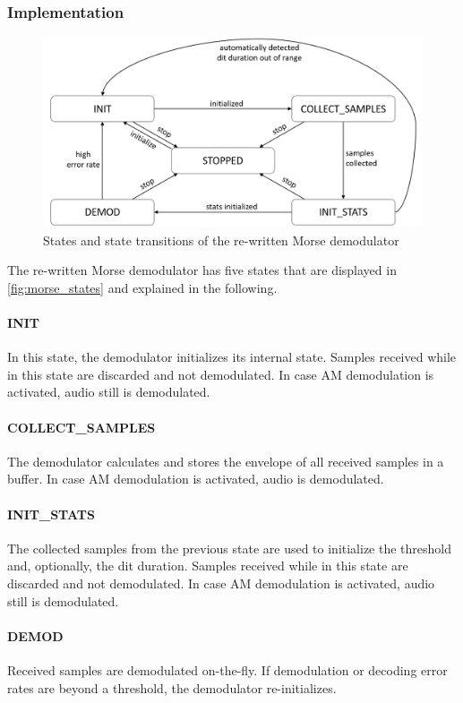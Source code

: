 \subsubsection{Implementation}

\begin{figure}
	\centering
	\includegraphics[width=1\linewidth]{gfx/morse_states.png}
	\caption{States and state transitions of the re-written Morse demodulator}
	\label{fig:morse_states}
\end{figure}

The re-written Morse demodulator has five states that are displayed in \autoref{fig:morse_states} and explained in the following.

\paragraph{INIT} In this state, the demodulator initializes its internal state. Samples received while in this state are discarded and not demodulated. In case \ac{AM} demodulation is activated, audio still is demodulated.
\paragraph{COLLECT\_{}SAMPLES} The demodulator calculates and stores the envelope of all received samples in a buffer. In case \ac{AM} demodulation is activated, audio is demodulated.
\paragraph{INIT\_{}STATS} The collected samples from the previous state are used to initialize the threshold and, optionally, the dit duration. Samples received while in this state are discarded and not demodulated. In case \ac{AM} demodulation is activated, audio still is demodulated.
\paragraph{DEMOD} Received samples are demodulated on-the-fly. If demodulation or decoding error rates are beyond a threshold, the demodulator re-initializes.
